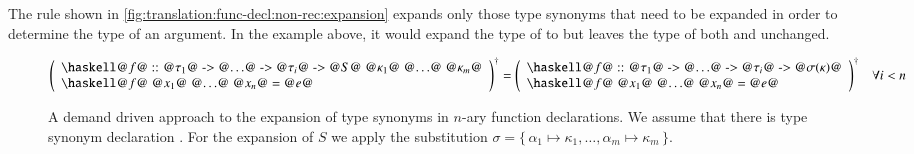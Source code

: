 The rule shown in \autoref{fig:translation:func-decl:non-rec:expansion} expands only those type synonyms that need to be expanded in order to determine the type of an argument.
In the example above, it would expand the type of  to  but leaves the type of both  and  unchanged.

\begin{figure}[H]
  \begin{align*}
    \toCoq{\left(
      \begin{array}{l}
        \haskellM{@$f$@ :: @$\tau_1$@ -> @$\ldots$@ -> @$\tau_i$@ -> @$S$@ @$\kappa_1$@ @$\ldots$@ @$\kappa_m$@} \\
        \haskellM{@$f$@ @$x_1$@ @$\ldots$@ @$x_n$@ = @$e$@}
      \end{array}
    \right)}
    = \toCoq{\left(
      \begin{array}{l}
        \haskellM{@$f$@ :: @$\tau_1$@ -> @$\ldots$@ -> @$\tau_i$@ -> @$\sigma(\kappa)$@} \\
        \haskellM{@$f$@ @$x_1$@ @$\ldots$@ @$x_n$@ = @$e$@}
      \end{array}
    \right)}
    &&\forall i < n
  \end{align*}
  \caption{
    A demand driven approach to the expansion of type synonyms in $n$-ary function declarations.
    We assume that there is type synonym declaration .
    For the expansion of $S$ we apply the substitution $\sigma = \{\, \alpha_1 \mapsto \kappa_1, \ldots, \alpha_m \mapsto \kappa_m \,\}$.
  }
  \label{fig:translation:func-decl:non-rec:expansion}
\end{figure}

